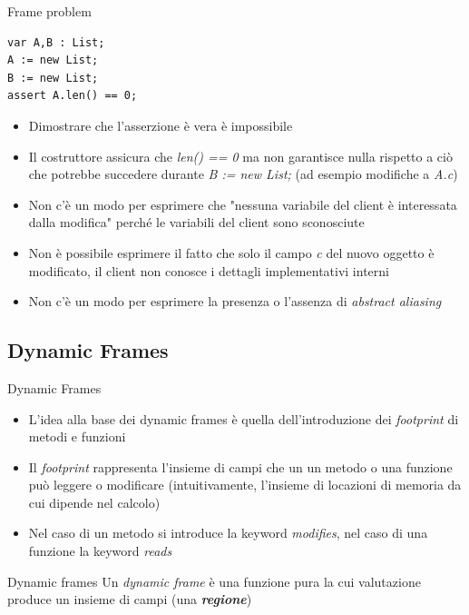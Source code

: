 \documentclass[]{beamer}
\begin{document}
\begin{frame}[containsverbatim]{Frame problem}
\lstset{linewidth=11cm}
\begin{lstlisting}
var A,B : List;
A := new List;
B := new List;
assert A.len() == 0;
\end{lstlisting}
\begin{itemize}
    \item Dimostrare che l'asserzione è vera è impossibile
    \item Il costruttore assicura che \textit{len() == 0} ma non garantisce nulla rispetto a ciò che potrebbe succedere durante \textit{B := new List;} (ad esempio modifiche a \textit{A.c})
    \item Non c'è un modo per esprimere che "nessuna variabile del client è interessata dalla modifica" perché le variabili del client sono sconosciute
    \item Non è possibile esprimere il fatto che solo il campo \textit{c} del nuovo oggetto è modificato, il client non conosce i dettagli implementativi interni
    \item Non c'è un modo per esprimere la presenza o l'assenza di \textit{abstract aliasing}
\end{itemize}
\end{frame}
\subsection{Dynamic Frames}
\begin{frame}{Dynamic Frames \cite{Dfav}}
\begin{itemize}
    \item L'idea alla base dei dynamic frames è quella dell'introduzione dei \textit{footprint} di metodi e funzioni
    \item Il \textit{footprint} rappresenta l'insieme di campi che un un metodo o una funzione può leggere o modificare (intuitivamente, l'insieme di locazioni di memoria da cui dipende nel calcolo)
    \item Nel caso di un metodo si introduce la keyword \textit{modifies}, nel caso di una funzione la keyword \textit{reads}
\end{itemize}
\begin{block}{Dynamic frames}
    Un \textit{dynamic frame} è una funzione pura la cui valutazione produce un insieme di campi (una \textit{\textbf{regione}})
\end{block}
\end{frame}
\end{document}
